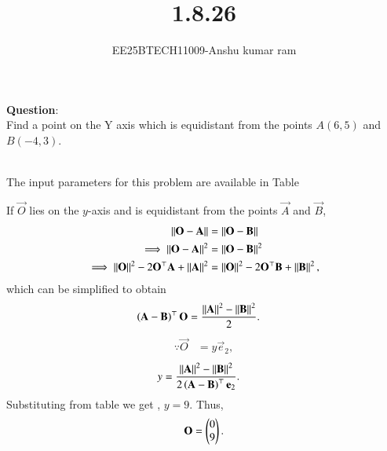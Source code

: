 \documentclass[journal]{IEEEtran}
\begin{document}

\vspace{3cm}

\title{1.8.26}
\author{EE25BTECH11009-Anshu kumar ram}
\maketitle
{\let\newpage\relax\maketitle}

\renewcommand{\thefigure}{\theenumi}
\renewcommand{\thetable}{\theenumi}
\setlength{\intextsep}{10pt}

\renewcommand{\thetable}{\theenumi}

\textbf{Question}:\\
Find a point on the Y axis which is equidistant from the points $A(6, 5)$ and $B(-4, 3)$.

\solution \\
The input parameters for this problem are available in Table 
\begin{table}[H]

\caption{}
\label{table}	
\end{table}

If $\vec{O}$ lies on the $y$-axis and is equidistant from the points $\vec{A}$ and $\vec{B}$, 
\begin{align}
 \left\lVert\mathbf{O}-\mathbf{A}\right\rVert &=
\left\lVert\mathbf{O}-\mathbf{B}\right\rVert 
\\
 \implies \left\lVert\mathbf{O}-\mathbf{A}\right\rVert^2 &=
\left\lVert\mathbf{O}-\mathbf{B}\right\rVert^2 
\\
 \implies \left\lVert\mathbf{O}\right\rVert^2-2{\mathbf{O}}^{\top}\mathbf{A} + \left\lVert\mathbf{A}\right\rVert^2
	&= \left\lVert\mathbf{O}\right\rVert^2-2{\mathbf{O}}^{\top}\mathbf{B} + \left\lVert\mathbf{B}\right\rVert^2,
\end{align}
which can be simplified to obtain
\begin{align}
	  \left(\mathbf{A}-\mathbf{B}\right)^\top   \mathbf{O}&=\frac{\left\lVert\mathbf{A}\right\rVert^2 -\left\lVert\mathbf{B}\right\rVert^2 }{2}.
\end{align}
\begin{align}
\because \vec{O} &= y\vec{e}_2,
\end{align}
\begin{align}
 y &=\frac{\left\lVert\mathbf{A}\right\rVert^2 -\left\lVert\mathbf{B}\right\rVert^2 }{2\left(\mathbf{A}-\mathbf{B}\right)^{\top }\mathbf{e}_2}.
 \label{eq:10/7/1/75}  
\end{align}
Substituting from table we get ,
 $y =  9$.  Thus, 
\begin{align}
\mathbf{O} = \begin{pmatrix} 0 \\ 9\end{pmatrix}.
\end{align}
\end{document}
